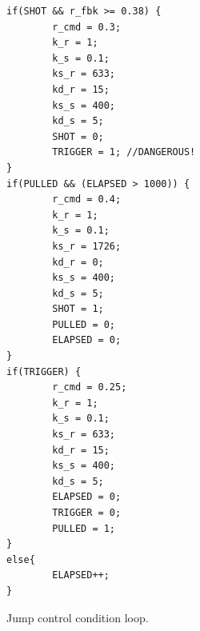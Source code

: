 \begin{listing}[ht]
\begin{verbatim}
if(SHOT && r_fbk >= 0.38) {
        r_cmd = 0.3;
        k_r = 1;
        k_s = 0.1;
        ks_r = 633;
        kd_r = 15;
        ks_s = 400;
        kd_s = 5;
        SHOT = 0;
        TRIGGER = 1; //DANGEROUS!
}
if(PULLED && (ELAPSED > 1000)) {
        r_cmd = 0.4;
        k_r = 1;
        k_s = 0.1;
        ks_r = 1726;
        kd_r = 0;
        ks_s = 400;
        kd_s = 5;
        SHOT = 1;
        PULLED = 0;
        ELAPSED = 0;
}
if(TRIGGER) {
        r_cmd = 0.25;
        k_r = 1;
        k_s = 0.1;
        ks_r = 633;
        kd_r = 15;
        ks_s = 400;
        kd_s = 5;
        ELAPSED = 0;
        TRIGGER = 0;
        PULLED = 1;
}
else{
        ELAPSED++;
}
\end{verbatim}
\caption{Jump control condition loop.}
\label{listing:Jump control condition loop}
\end{listing}